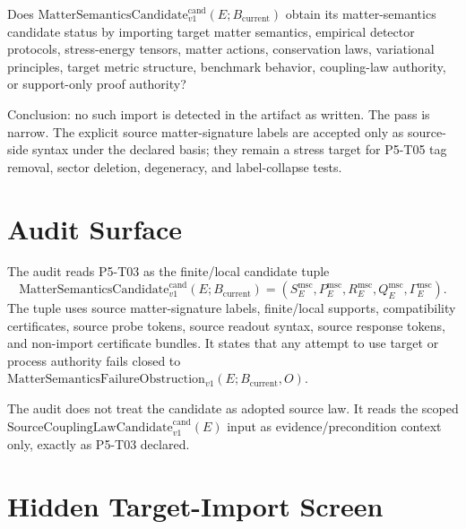 \documentclass[11pt]{article}
\newcommand{\SCLC}{\mathrm{SourceCouplingLawCandidate}^{\mathrm{cand}}_{v1}}
\newcommand{\Bcur}{B_{\mathrm{current}}}
\newcommand{\MSCand}{\mathrm{MatterSemanticsCandidate}^{\mathrm{cand}}_{v1}}
\newcommand{\FailureObs}{\mathrm{MatterSemanticsFailureObstruction}_{v1}}
\begin{document}
Does \(\MSCand(E;\Bcur)\) obtain its matter-semantics candidate status by
importing target matter semantics, empirical detector protocols,
stress-energy tensors, matter actions, conservation laws, variational
principles, target metric structure, benchmark behavior, coupling-law
authority, or support-only proof authority?

Conclusion: no such import is detected in the artifact as written. The pass is
narrow. The explicit source matter-signature labels are accepted only as
source-side syntax under the declared basis; they remain a stress target for
P5-T05 tag removal, sector deletion, degeneracy, and label-collapse tests.

\section{Audit Surface}

The audit reads P5-T03 as the finite/local candidate tuple
\[
  \MSCand(E;\Bcur)=(S_E^{\mathrm{msc}},P_E^{\mathrm{msc}},
  R_E^{\mathrm{msc}},Q_E^{\mathrm{msc}},\Gamma_E^{\mathrm{msc}}).
\]
The tuple uses source matter-signature labels, finite/local supports,
compatibility certificates, source probe tokens, source readout syntax,
source response tokens, and non-import certificate bundles. It states that any
attempt to use target or process authority fails closed to
\(\FailureObs(E;\Bcur,O)\).

The audit does not treat the candidate as adopted source law. It reads the
scoped \(\SCLC(E)\) input as evidence/precondition context only, exactly as
P5-T03 declared.

\section{Hidden Target-Import Screen}
\end{document}
